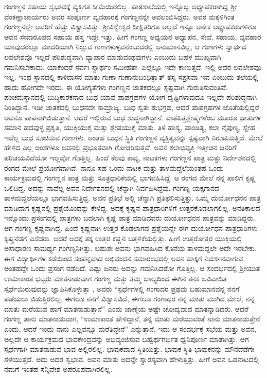 {ಗಂಗಣ್ಣನ ಸಹಾಯ ಸ್ವಭಾವಕ್ಕೆ ವ್ಯಕ್ತಿಗತ ಸೀಮೆಯಿರಲಿಲ್ಲ. ಪಾಠಶಾಲೆಯಲ್ಲಿ ಇನ್ನೊಬ್ಬ ಅಧ್ಯಾಪಕರಾಗಿದ್ದ ಶ್ರೀ ವೆಂಕಣ್ಣಾಚಾರ್ಯರು ಅವರ ಸಂಪೂರ್ಣ ವ್ಯವಹಾರಕ್ಕೆ ಗಂಗಣ್ಣನನ್ನೇ ಅವಲಂಬಿಸಿದ್ದರು. ಅವರ ಮಕ್ಕಳಿಗಿಂತ ಗಂಗಣ್ಣನಲ್ಲೇ ಅವರಿಗೆ ಹೆಚ್ಚು ವಿಶ್ವಾಸವಿತ್ತು. ಶ್ರೀವಿಶ್ವೇಶ್ವರ ದೀಕ್ಷಿತರಿಗೂ ಅಲ್ಲದೆ ಇನ್ನೂ ಅನೇಕ ಅಧ್ಯಾಪಕರುಗಳಿಗೂ ಅವನ ಸೇವಾರೂಪದ ಸಹಾಯ ಹಸ್ತ ಇದ್ದೇ ಇತ್ತು.  ಹೀಗೆ ಗಂಗಣ್ಣ ಅಧ್ಯಯನ ಅಧ್ಯಾಪನ, ಸೇವೆ, ಸಹಾಯ, ವ್ಯವಹಾರ ಯಾವುದರಲ್ಲೂ ಮಾದರಿಯಾಗಿ ನಿಲ್ಲುವ ಗುಣಗಳುಳ್ಳವನೆಂಬುದರಲ್ಲಿ ಅನುಮಾನವಿಲ್ಲ, ಆ ಗುಣಗಳು ಸ್ವಾರ್ಥದ ಲವಲೇಶವೂ ಇಲ್ಲದೆ ಪರಿಶುದ್ಧವಾಗಿ ವ್ಯಾಪಾರ ಮಾಡುವಂಥವುಗಳು ಎಂಬುದು ಬಹಳ ಮುಖ್ಯವಾಗಿ ಗಮನಿಸಬೇಕಾದು. ಯಾಕೆಂದರೆ ಸರ್ವಃ ಸ್ವಾರ್ಥಂ ಸಮೀಹತೇ. ಎಲ್ಲೆಲ್ಲೂ ಇದೇ ಕಾಣುತ್ತದೆ. ಇಲ್ಲಿ ಅದರ ಲವಲೇಶವೂ ಇಲ್ಲ.  ಇಂಥ ಸ್ಥಾನದಲ್ಲಿ ಕಾಳಿದಾಸನ ಮಾತು \enginline{-} ಗುಣಾ ಗುಣಾನುಬಂಧಿತ್ವಾತ್ ತಸ್ಯ ಸಪ್ರಸವಾ ಇವ ಎಂಬುದು ತಲೆಯಲ್ಲಿ ಹಾದು ಹೋಗದೇ ಇರದು. ಈ ಯೋಗ್ಯತೆಗಳು ಗಂಗಣ್ಣನ ಜಾತಕದಲ್ಲೂ ಸ್ಪಷ್ಟವಾಗಿ ಗುರುತಿಸುವಂತಿವೆ. ಪಂಚಮಸ್ಥಾನದಲ್ಲಿ ಬುದ್ಧಿಕಾರಕನಾದ ಬುಧ ಯಾವ ಪಾಪಗ್ರಹಗಳ ಯೋಗ ದೃಷ್ಟಿಗಳಾವುದೂ ಇಲ್ಲದೇ ಪರಿಶುದ್ಧನಾಗಿ ನಿಂತಿದ್ದಾನೆ. ಇಡೀ ಜಾತಕದಲ್ಲಿ ಬುಧನದೇ ಸಾಮ್ರಾಜ್ಯ. ಬುಧ ಸ್ವತಃ ಶುಭಗ್ರಹ, ಆದರೆ ಪಾಪಗ್ರಹಗಳ ಜೊತೆಯಲ್ಲಿದ್ದರೆ ಅವನೂ ಪಾಪನಾಗಿಬಿಡುತ್ತಾನೆ. ಆದರೆ ಇಲ್ಲಿರುವ ಬುಧ ಶುದ್ಧನಾಗಿದ್ದಾನೆ. ವಾತಪಿತ್ತಶ್ಲೇಷ್ಮಗಳೆಂಬ ಮೂರೂ ಧಾತುಗಳ ಸಮಾನ ಹದವುಳ್ಳ ಪ್ರಕೃತಿ, ಯುಕ್ತಿಯುಕ್ತ ಮತ್ತು ಶ್ಲೇಷಯುಕ್ತ ಮಾತು. ತಿಳಿ ಹಾಸ್ಯ, ಪಾಂಡಿತ್ಯ, ಕಲಾ ನೈಪುಣ್ಯ, ಸ್ನೇಹ ಇವೆಲ್ಲ ಬುಧ ಸೂಚಿಸುವ ಗುಣಗಳು. ಅಂತಹ ಬುಧನ ಸ್ಥಿತಿ ಗಂಗಣ್ಣನ ವ್ಯಕ್ತಿತ್ವವನ್ನು ಸ್ಪಷ್ಟವಾಗಿ ನಿರೂಪಿಸುತ್ತಿದೆ. ಮೇಲೆ ಹೇಳಿದ ಎಲ್ಲ ಅಂಶಗಳೂ ಅವನಲ್ಲಿ ಪ್ರಭೂತವಾಗಿ ಗೋಚರಿಸುತ್ತವೆ. ಅವನ ಕಲಾಭಿವ್ಯಕ್ತಿ ಇತ್ತೀಚಿನ ಜನರಿಗೆ ಪರಿಚಯವಿದೆಯೋ ಇಲ್ಲವೋ ಗೊತ್ತಿಲ್ಲ. ಹಿಂದೆ ಕೆಲವು ಕಾವ್ಯ, ನಾಟಕಗಳು ಗಂಗಣ್ಣನ ಪಾತ್ರ ಮತ್ತು ನಿರ್ದೇಶನದಲ್ಲಿ ರಂಗದ ಮೇಲೆ ಪ್ರಯೋಗವಾಗಿವೆ. ನಾನೂ ಸಹ ಒಂದು ನಾಟಕ ಮತ್ತು ತಾಳಮದ್ದೆಲೆಯಂತಹ ಒಂದು ಕಾರ್ಯಕ್ರಮದಲ್ಲಿ ಗಂಗಣ್ಣನ ಪಾತ್ರ ಮತ್ತು ಸೂತ್ರಧಾರಿಕೆಯಲ್ಲಿ ಭಾಗವಹಿಸಿದ್ದೆ. ಆ ರಂಗದ ಮೇಲೆ ನನ್ನ ಪಾಲಿಗೆ ಕೃಷ್ಣ ಒಲಿದಿದ್ದ. ಅದನ್ನು ನಾವೆಲ್ಲ ಅವನ ನಿರ್ದೇಶನದಲ್ಲಿ ಚೆನ್ನಾಗಿ ನಿರ್ವಹಿಸಿದ್ದೆವು. ಗಂಗಣ್ಣ ಯಕ್ಷಗಾನದ ತಾಳಮದ್ದಲೆಯಲ್ಲೂ ಭಾಗವಹಿಸುತ್ತಿದ್ದ. ಅವನ ಪ್ರತಿಭೆ ಅಲ್ಲಿ ಚೆನ್ನಾಗಿ ಪ್ರತಿಫಲಿಸುತ್ತಿತ್ತು. ಒಮ್ಮೆ ದುರ್ಯೋಧನನ ಪಾತ್ರ ಮಾಡಿದಾಗ ಕೃಷ್ಣನಲ್ಲಿ ಪ್ರಶ್ನೆಯೊಂದನ್ನು ಕೇಳಿದ್ದ. ಅದಕ್ಕೆ ಕೃಷ್ಣನ ಪಾತ್ರಧಾರಿಗಳಿಗೆ ಉತ್ತರಕೊಡಲಾಗಲಿಲ್ಲ. ಅನತಿಕಾಲದ ಇನ್ನೊಂದು ಪ್ರಸಂಗದಲ್ಲಿ ಪಾತ್ರಗಳು ಬದಲಾಗಿ ಕೃಷ್ಣ ಪಾತ್ರ ಮಾಡಿದವರು ದುರ್ಯೋಧನನ ಪಾತ್ರವನ್ನು ಮಾಡಿದ್ದರು. ಆಗ ಗಂಗಣ್ಣ ಕೃಷ್ಣನಾಗಿದ್ದ. ಹಿಂದೆ ಕೃಷ್ಣನಾಗಿ ಉತ್ತರ ಕೊಡಲಾಗದ ಪ್ರಶ್ನೆಯನ್ನೇ ಈಗ ದುರ್ಯೋಧನ ಪಾತ್ರಧಾರಿಗಳು ಕೃಷ್ಣನೆಡಗೆ ಎಸೆದರು. ಆದರೆ ಅದಕ್ಕೆ ತಕ್ಕ ಉತ್ತರ ಕಷ್ಣನ ಬತ್ತಳಿಕೆಯಲ್ಲಿತ್ತು. ಹೀಗೆ ಉತ್ತರೋತ್ತರ ಯುಕ್ತಿಯಲ್ಲಿ ಅಸಾಧಾರಣ ಸಾಮರ್ಥ್ಯ ಗಂಗಣ್ನನಿಗಿತ್ತು. ಬಹುಶಃ ಅವನು ಭಾಗವಹಿಸಿದ ಕೊನೆಯ ತಾಳಮದ್ದಲೇ ಅದೇ ಇರಬೇಕು. ಈಗ ವಿದ್ಯಾರ್ಥಿಗಳ ಕಡೆಯಿಂದ ಸಂಪನ್ನವಾದ ಅಭಿವಂದನ ಸಮಾರಂಭದಲ್ಲಿ ಅವನ ವಾಕ್ಕಿಗೆ ನಿದರ್ಶನವಾಗುವ ಅಂತಹದ್ದೇ ಒಂದು ಪ್ರಸಂಗ ನಡೆದಿದೆ. ಎಷ್ಟು ಜನರು ಅದನ್ನು ಗಮನಿಸಿದರೋ ಗೊತ್ತಿಲ್ಲ. ಆ ಸಂದರ್ಭದಲ್ಲಿ  ಶ್ರೀಯುತ ಉಮಾಕಾಂತ ಭಟ್ಟರು ಮಾತನಾಡುವಾಗ ಗಂಗಣ್ಣ ಮತ್ತು ತಮ್ಮ ಬಾಲ್ಯದಿಂದ ಈಗಿನ ತನಕ ಅವಿವಾದಿತ ಸ್ಪರ್ಧೆಯಿರುವುದನ್ನು ಜ್ಞಾಪಿಸಿಕೊಳ್ಳುತ್ತಾ , ಅವರು “ಸ್ಪರ್ಧೆಗಳಲ್ಲಿ ಗಂಗಾದರ ಪ್ರಥಮ ಬಹುಮಾನವನ್ನ ನನಗೆ ಪಡೆಯಲು ಬಿಡುತ್ತಿರಲಿಲ್ಲ. \enginline{-} ಈಗಲೂ ನನಗೆ ವಿಶ್ವಾಸವಿದೆ, ಈಗಲೂ ಗಂಗಾಧರ ನನ್ನ ಮಾತು ಮುಗಿದ ಮೇಲೆ, ನನ್ನ ಮಾತು ಮರೆಯುವ ಹಾಗೆ ಮಾತನಾಡುತ್ತಾನೆ” ಎಂದು ಜಾಣ್ಮೆಯ ಅಷ್ಟೇ ಚೋದ್ಯವಾದ ಮಾತನ್ನಾಡಿದರು. ಆದರೆ ಗಂಗಣ್ಣ ತಾನು ಮಾತನಾಡುವಾಗ, “ಉಮಾಕಾಂತ ಹೇಳಿದ್ದಾನೆ, ತನ್ನ ಮಾತು ಮರೆಯುವಂತೆ ನಾನು ಮಾತನಾಡುತ್ತೇನೆ ಎಂದು, ಆದರೆ ಇಂದು ನಾನು ಎಲ್ಲವನ್ನೂ ಮರೆತಿದ್ದೇನೆ” ಎನ್ನುತ್ತಾನೆ. ಇದು ಆ ಸಂದರ್ಭಕ್ಕೆ ಸಭೆಯ ಮತ್ತು ಅವನ, ಅಲ್ಲದೇ ಆ ಕಾರ್ಯಕ್ರಮದ ಭಾವಕೇಂದ್ರವನ್ನು ಅಭಿವ್ಯಂಜಿಸುವ ಬಹ್ವರ್ಥಗರ್ಭಿತ ಧ್ವನಿಪೂರ್ಣ ಮಾತಾಗಿತ್ತು. ಆಗ ಸ್ಪರ್ಧೆಗಾಗಿ ಮಾತನಾಡುವ ಭಾವ ಅಲ್ಲಿರಲಿಲ್ಲ. ಭಾವುಕವಾದ ಸ್ಥಿತಿಯಿತ್ತು. ಭಾವುಕ ಸ್ಥಿತಿ ಭಾವುಕನನ್ನು ಮೌನದೆಡೆಗೇ ಸೆಳೆಯುತ್ತದೆ. ಅದು ಅದರ ಸ್ವಭಾವ. ಅವನ ಮಾತು ಅದನ್ನೇ ಸ್ವಾರಸ್ಯವಾಗಿ ಹೇಳುತ್ತಿತ್ತು. ಹೀಗೆ ಅವನ ಒಡನಾಟದಲ್ಲಿ ನಮಗೆ ಇಂತಹ ಸನ್ನಿವೇಶ ಅಪರೂಪವಾಗಿರಲಿಲ್ಲ. 

}
